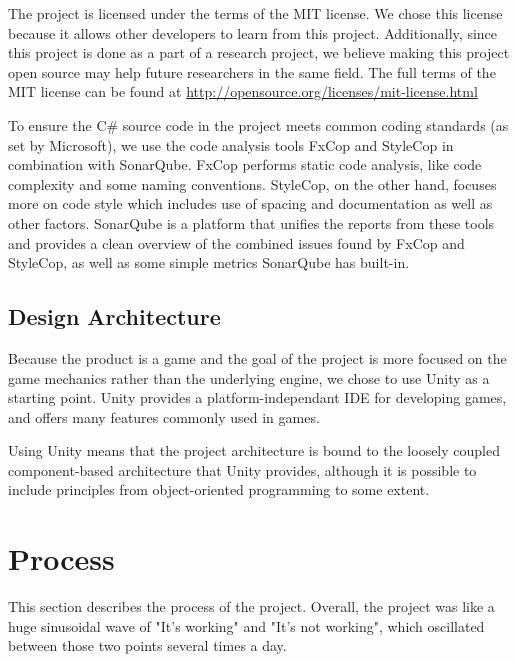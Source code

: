       The project is licensed under the terms of the MIT license. We chose
      this license because it allows other developers to learn from this
      project. Additionally, since this project is done as a part of a
      research project, we believe making this project open source may
      help future researchers in the same field. The full terms of the MIT
      license can be found at \url{http://opensource.org/licenses/mit-license.html}

      To ensure the C\# source code in the project meets common coding standards
      (as set by Microsoft), we use the code analysis tools FxCop and StyleCop
      in combination with SonarQube. FxCop performs static code analysis, like
      code complexity and some naming conventions. StyleCop, on the other hand,
      focuses more on code style which includes use of spacing and
      documentation as well as other factors. SonarQube is a platform that
      unifies the reports from these tools and provides a clean overview of the
      combined issues found by FxCop and StyleCop, as well as some simple metrics
      SonarQube has built-in.

    \subsection{Design Architecture} \label{ssec:designarchitecture}
      Because the product is a game and the goal of the project is more
      focused on the game mechanics rather than the underlying engine, we chose
      to use Unity as a starting point. Unity provides a platform-independant
      IDE for developing games, and offers many features commonly used in
      games.

      Using Unity means that the project architecture is bound to the
      loosely coupled component-based architecture that Unity provides,
      although it is possible to include principles from object-oriented
      programming to some extent.
      
    \section{Process}\label{sec:process}
      This section describes the process of the project. Overall, the project
      was like a huge sinusoidal wave of "It's working" and "It's not working",
      which oscillated between those two points several times a day.
      
